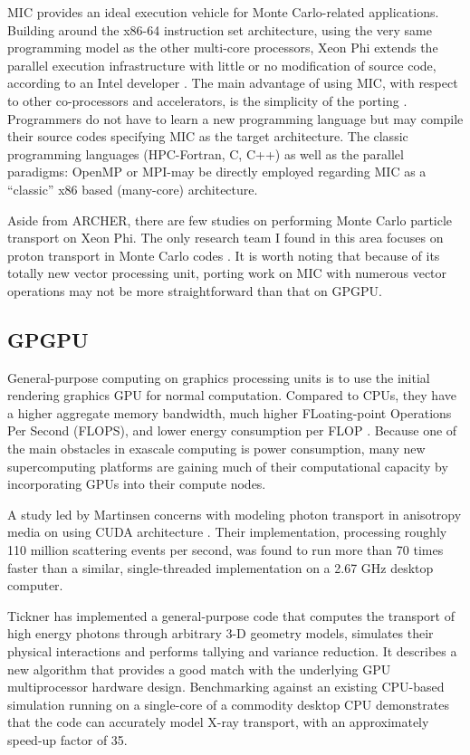 MIC provides an ideal execution vehicle for Monte Carlo-related applications. Building around the x86-64 instruction set architecture, using the very same programming model as the other multi-core processors, Xeon Phi extends the parallel execution infrastructure with little or no modification of source code, according to an Intel developer \citep{micdeveloper}. The main advantage of using MIC, with respect to other co-processors and accelerators, is the simplicity of the porting \citep{Bernaschi20142495}. Programmers do not have to learn a new programming language but may compile their source codes specifying MIC as the target architecture. The classic programming languages (HPC-Fortran, C, C++) as well as the parallel paradigms: OpenMP or MPI-may be directly employed regarding MIC as a “classic” x86 based (many-core) architecture.

Aside from ARCHER, there are few studies on performing Monte Carlo particle transport on Xeon Phi. The only research team I found in this area focuses on proton transport in Monte Carlo codes \citep{souris2014th, sterpin2014180}. It is worth noting that because of its totally new vector processing unit, porting work on MIC with numerous vector operations may not be more straightforward than that on GPGPU.

\subsection{GPGPU}
General-purpose computing on graphics processing units is to use the initial rendering graphics GPU for normal computation. Compared to CPUs, they have a higher aggregate memory bandwidth, much higher FLoating-point Operations Per Second (FLOPS), and lower energy consumption per FLOP \citep{Reference2}. Because one of the main obstacles in exascale computing is power consumption, many new supercomputing platforms are gaining much of their computational capacity by incorporating GPUs into their compute nodes.

A study led by Martinsen concerns with modeling photon transport in anisotropy media on using CUDA architecture \citep{Reference1}. Their implementation, processing roughly 110 million scattering events per second, was found to run more than 70 times faster than a similar, single-threaded implementation on a 2.67 GHz desktop computer.

Tickner \citep{Reference3} has implemented a general-purpose code that computes the transport of high energy photons through arbitrary 3-D geometry models, simulates their physical interactions and performs tallying and variance reduction. It describes a new algorithm that provides a good match with the underlying GPU multiprocessor hardware design. Benchmarking against an existing CPU-based simulation running on a single-core of a commodity desktop CPU demonstrates that the code can accurately model X-ray transport, with an approximately speed-up factor of 35.

